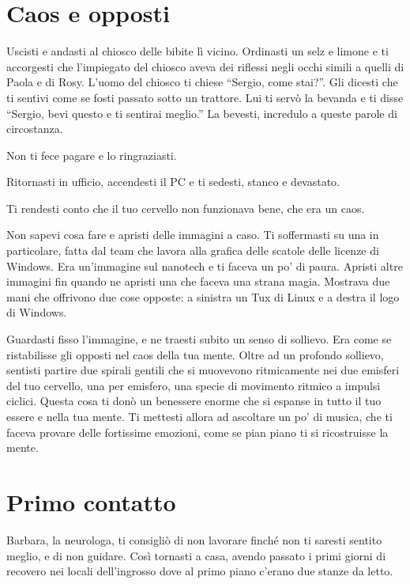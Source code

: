 \section{Caos e opposti}
\label{caos_e_opposti}

Uscisti e andasti al chiosco delle bibite lì vicino. Ordinasti un selz e limone e ti accorgesti che l'impiegato del chiosco aveva dei riflessi negli occhi simili a quelli di Paola e di Rosy. L'uomo del chiosco ti chiese “Sergio, come stai?”. Gli dicesti che ti sentivi come se fosti passato sotto un trattore. Lui ti servò la bevanda e ti disse “Sergio, bevi questo e ti sentirai meglio.” La bevesti, incredulo a queste parole di circostanza.

Non ti fece pagare e lo ringraziasti.

Ritornasti in ufficio, accendesti il PC e ti sedesti, stanco e devastato.

Ti rendesti conto che il tuo cervello non funzionava bene, che era un caos.

Non sapevi cosa fare e apristi delle immagini a caso. Ti soffermasti su una in particolare, fatta dal team che lavora alla grafica delle scatole delle licenze di Windows. Era un'immagine sul nanotech e ti faceva un po' di paura. Apristi altre immagini fin quando ne apristi una che faceva una strana magia. Mostrava due mani che offrivono due cose opposte: a sinistra un Tux di Linux e a destra il logo di Windows.

Guardasti fisso l'immagine, e ne traesti subito un senso di sollievo. Era come se ristabilisse gli opposti nel caos della tua mente. Oltre ad un profondo sollievo, sentisti partire due spirali gentili che si muovevono ritmicamente nei due emisferi del tuo cervello, una per emisfero, una specie di movimento ritmico a impulsi ciclici. Questa cosa ti donò un benessere enorme che si espanse in tutto il tuo essere e nella tua mente. Ti mettesti allora ad ascoltare un po' di musica, che ti faceva provare delle fortissime emozioni, come se pian piano ti si ricostruisse la mente.

\section{Primo contatto}
\label{primo_contatto}

Barbara, la neurologa, ti consigliò di non lavorare finché non ti saresti sentito meglio, e di non guidare. Così tornasti a casa, avendo passato i primi giorni di recovero nei locali dell'ingrosso dove al primo piano c'erano due stanze da letto.

